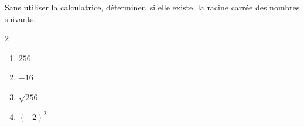 \begin{exo}{}
	Sans utiliser la calculatrice, déterminer, si elle existe, la racine carrée des nombres suivants.
	\vspace*{-2mm}\begin{multicols}{2}
	\begin{enumerate}[itemsep=2mm]
		\item $256$
		\item $-16$
		\item $\sqrt{256}$
		\item $(-2)^2$
	\end{enumerate}
	\end{multicols}\vspace*{-2mm}
\end{exo}
